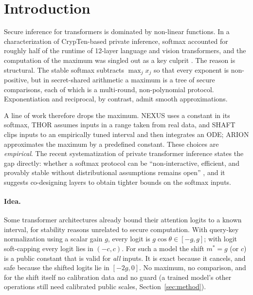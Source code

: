 \documentclass[11pt]{article}
\newcommand{\mstar}{m^{*}}
\begin{document}
\section{Introduction}
Secure inference for transformers is dominated by non-linear functions. In a characterization of
CrypTen-based private inference, softmax accounted for roughly half of the runtime of 12-layer
language and vision transformers, and the computation of the maximum was singled out as a key
culprit \cite{wang_ispass_2022}. The reason is structural. The stable softmax subtracts
$\max_j x_j$ so that every exponent is non-positive, but in secret-shared arithmetic a maximum is a
tree of secure comparisons, each of which is a multi-round, non-polynomial protocol. Exponentiation and
reciprocal, by contrast, admit smooth approximations.

A line of work therefore drops the maximum. NEXUS \cite{nexus_2025} uses a constant in its
softmax, THOR \cite{thor_2025} assumes inputs in a range taken from real data, and SHAFT
\cite{shaft_2025} clips inputs to an empirically tuned interval and then integrates an ODE;
ARION \cite{arion_2025} approximates the maximum by a predefined constant. These choices are
\emph{empirical}. The recent systematization of private transformer inference states the gap
directly: whether a softmax protocol can be ``non-interactive, efficient, and provably stable
without distributional assumptions remains open'' \cite{sok_2026}, and it suggests co-designing
layers to obtain tighter bounds on the softmax inputs.

\paragraph{Idea.}
Some transformer architectures already bound their attention logits to a known interval, for
stability reasons unrelated to secure computation. With query-key normalization
\cite{henry_qknorm_2020} using a scalar gain $g$, every logit is $g\cos\theta\in[-g,g]$; with
logit soft-capping \cite{gemma2_2024} every logit lies in $(-c,c)$. For such a model the shift
$\mstar=g$ (or $c$) is a public constant that is valid for \emph{all} inputs. It is exact because
it cancels, and safe because the shifted logits lie in $[-2g,0]$. No maximum, no comparison,
and for the shift itself no calibration data and no guard (a trained model's other operations still need calibrated public
scales, Section~\ref{sec:method}).
\end{document}
